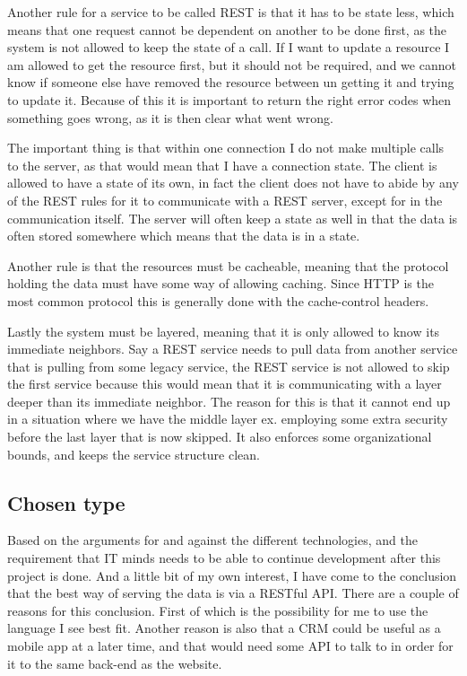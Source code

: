 Another rule for a service to be called REST is that it has to be state less,
which means that one request cannot be dependent on another to be done first, as
the system is not allowed to keep the state of a call. If I want to update a
resource I am allowed to get the resource first, but it should not be required,
and we cannot know if someone else have removed the resource between un getting
it and trying to update it. Because of this it is important to return the right
error codes when something goes wrong, as it is then clear what went wrong. 

The important thing is that within one connection I do not make multiple calls
to the server, as that would mean that I have a connection state. The client is
allowed to have a state of its own, in fact the client does not have to abide by
any of the REST rules for it to communicate with a REST server, except for in
the communication itself. The server will often keep a state as well in that the
data is often stored somewhere which means that the data is in a state. 

Another rule is that the resources must be cacheable, meaning that the protocol
holding the data must have some way of allowing caching. Since HTTP is the most
common protocol this is generally done with the cache-control
headers\cite{rest:elkstein:architeture}. 

Lastly the system must be layered\cite{rest:uci}, meaning that it is only
allowed to know its immediate neighbors. Say a REST service needs to pull data
from another service that is pulling from some legacy service, the REST service
is not allowed to skip the first service because this would mean that it is
communicating with a layer deeper than its immediate neighbor. The reason for
this is that it cannot end up in a situation where we have the middle layer ex.
employing some extra security before the last layer that is now skipped. It also
enforces some organizational bounds, and keeps the service structure clean. 

\subsection{Chosen type }
\label{sub:Chosen type}
Based on the arguments for and against the different technologies, and the
requirement that IT minds needs to be able to continue development after this
project is done. And a little bit of my own interest, I have come to the
conclusion that the best way of serving the data is via a RESTful API. There are
a couple of reasons for this conclusion. First of which is the possibility for
me to use the language I see best fit. Another reason is also that a CRM could
be useful as a mobile app at a later time, and that would need some API to talk
to in order for it to the same back-end as the website. 

